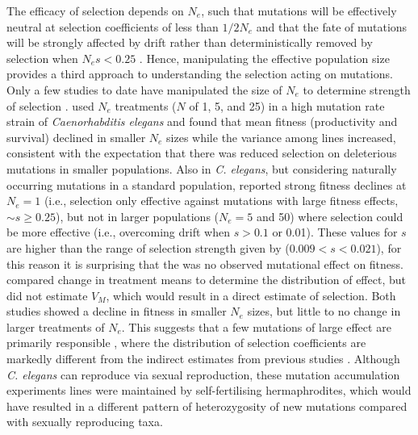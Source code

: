 The efficacy of selection depends on $N_e$, such that mutations will be effectively neutral at selection coefficients of less than $1/2N_e$ \citep{Wrig31} and that the fate of mutations will be strongly affected by drift rather than deterministically removed by selection when $N_es<0.25$ \citep{Falc81}. Hence, manipulating the effective population size provides a third approach to understanding the selection acting on mutations. Only a few studies to date have manipulated the size of $N_e$ to determine strength of selection \citep{Este04, Sila07, Katj15}. \citet{Este04} used $N_e$ treatments ($N$ of 1, 5, and 25) in a high mutation rate strain of \textit{Caenorhabditis elegans} and found that mean fitness (productivity and survival) declined in smaller $N_e$ sizes while the variance among lines increased, consistent with the expectation that there was reduced selection on deleterious mutations in smaller populations. Also in \textit{C. elegans}, but considering naturally occurring mutations in a standard population, \citet{Katj15} reported strong fitness declines at $N_e = 1$ (i.e., selection only effective against mutations with large fitness effects, $\sim s \geq 0.25$), but not in larger populations ($N_e = 5$ and 50) where selection could be more effective (i.e., overcoming drift when $s > 0.1$ or 0.01). These values for $s$ are higher than the range of selection strength given by \citet{Houl96} ($0.009<s< 0.021$), for this reason it is surprising that the was no observed mutational effect on fitness. \citet{Katj15} compared change in treatment means to determine the distribution of effect, but did not estimate $V_M$, which would result in a direct estimate of selection. Both studies showed a decline in fitness in smaller $N_e$ sizes, but little to no change in larger treatments of $N_e$. This suggests that a few mutations of large effect are primarily responsible \citep{Este04, Hall09, Katj15}, where the distribution of selection coefficients are markedly different from the indirect estimates from previous studies \citep{Houl96}. Although \textit{C. elegans} can reproduce via sexual reproduction, these mutation accumulation experiments lines were maintained by self-fertilising hermaphrodites, which would have resulted in a different pattern of heterozygosity of new mutations compared with sexually reproducing taxa. \par

